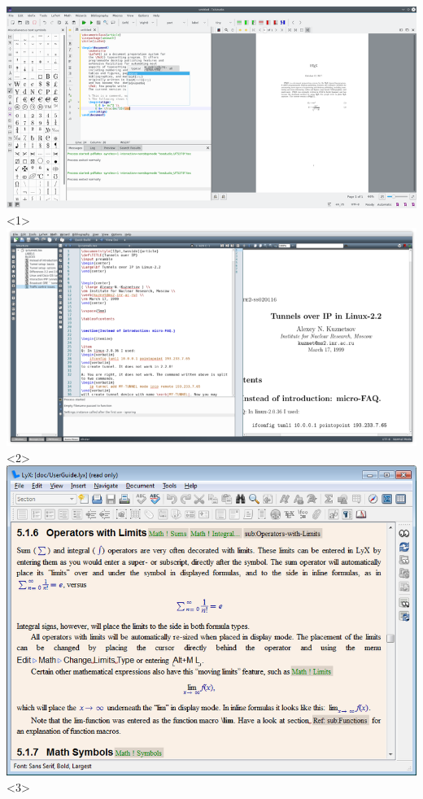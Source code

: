 \documentclass{beamer}
\begin{document}
{\begin{columns}[onlytextwidth,T]
				\includegraphics[width=\linewidth]{texstudio.png}<1>
				\includegraphics[width=\linewidth]{texmaker.png}<2>
				\includegraphics[width=\linewidth]{lyx.png}<3>

\end{columns}}
\end{document}
